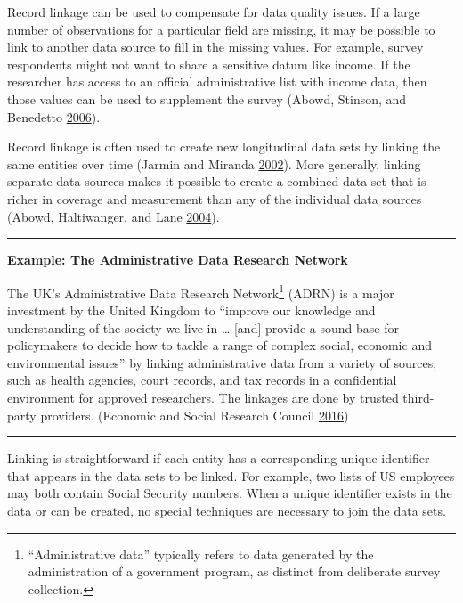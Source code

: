 \documentclass[]{krantz}
\begin{document}
Record linkage can be used to compensate for data quality issues. If a
large number of observations for a particular field are missing, it may
be possible to link to another data source to fill in the missing
values. For example, survey respondents might not want to share a
sensitive datum like income. If the researcher has access to an official
administrative list with income data, then those values can be used to
supplement the survey (Abowd, Stinson, and Benedetto
\protect\hyperlink{ref-abowd2006final}{2006}).

Record linkage is often used to create new longitudinal data sets by
linking the same entities over time (Jarmin and Miranda
\protect\hyperlink{ref-jarmin2002longitudinal}{2002}). More generally,
linking separate data sources makes it possible to create a combined
data set that is richer in coverage and measurement than any of the
individual data sources (Abowd, Haltiwanger, and Lane
\protect\hyperlink{ref-abowd2004integrated}{2004}).

\begin{center}\rule{0.5\linewidth}{\linethickness}\end{center}

\textbf{Example: The Administrative Data Research Network}

The UK's Administrative Data Research Network\footnote{``Administrative
  data'' typically refers to data generated by the administration of a
  government program, as distinct from deliberate survey collection.}
(ADRN) is a major investment by the United Kingdom to ``improve our
knowledge and understanding of the society we live in \ldots{} {[}and{]}
provide a sound base for policymakers to decide how to tackle a range of
complex social, economic and environmental issues'' by linking
administrative data from a variety of sources, such as health agencies,
court records, and tax records in a confidential environment for
approved researchers. The linkages are done by trusted third-party
providers. (Economic and Social Research Council
\protect\hyperlink{ref-EconomicandSocialResearchCouncil2016}{2016})

\begin{center}\rule{0.5\linewidth}{\linethickness}\end{center}

Linking is straightforward if each entity has a corresponding unique
identifier that appears in the data sets to be linked. For example, two
lists of US employees may both contain Social Security numbers. When a
unique identifier exists in the data or can be created, no special
techniques are necessary to join the data sets.
\end{document}
